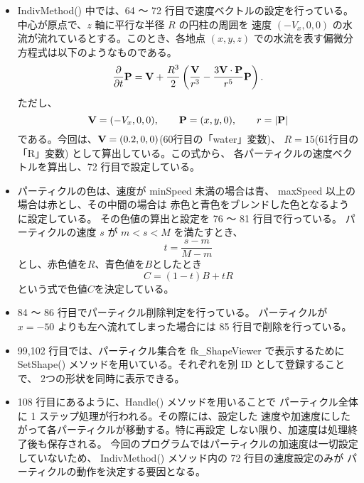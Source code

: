 \begin{itemize}
 \item IndivMethod() 中では、64 〜 72 行目で速度ベクトルの設定を行っている。
	中心が原点で、\(z\) 軸に平行な半径 \(R\) の円柱の周囲を
	速度 \((-V_x, 0, 0)\) の水流が流れているとする。このとき、各地点
	\((x, y, z)\) での水流を表す偏微分方程式は以下のようなものである。
	\begin{equation}
		\frac{\partial}{\partial t}\mathbf{P} =
		\mathbf{V} + \frac{R^3}{2}
		\left(\frac{\mathbf{V}}{r^3} -
		\frac{3 \mathbf{V} \cdot \mathbf{P}}{r^5} \mathbf{P} \right) .
	\end{equation}
	ただし、
	\begin{equation}
		\mathbf{V} = (-V_x, 0, 0), \qquad
		\mathbf{P} = (x, y, 0), \qquad r = |\mathbf{P}|
	\end{equation}
	である。今回は、\(\mathbf{V} = (0.2, 0, 0)\)(60行目の「water」変数)、
	\(R = 15\)(61行目の「R」変数) として算出している。この式から、
	各パーティクルの速度ベクトルを算出し、72 行目で設定している。

 \item パーティクルの色は、速度が minSpeed 未満の場合は青、
	maxSpeed 以上の場合は赤とし、その中間の場合は
	赤色と青色をブレンドした色となるように設定している。
	その色値の算出と設定を 76 〜 81 行目で行っている。
	パーティクルの速度 \(s\) が \(m < s < M\) を満たすとき、
	\begin{equation}
		t = \frac{s - m}{M - m}
	\end{equation}
	とし、赤色値を\(R\)、青色値を\(B\)としたとき
	\begin{equation}
		 C = (1-t)B + tR
	\end{equation}
	という式で色値\(C\)を決定している。

 \item 84 〜 86 行目でパーティクル削除判定を行っている。
	パーティクルが \(x = -50\) よりも左へ流れてしまった場合には
	85 行目で削除を行っている。

 \item 99,102 行目では、パーティクル集合を fk\_ShapeViewer で表示するために
	SetShape() メソッドを用いている。それぞれを別 ID として登録することで、
	2つの形状を同時に表示できる。

 \item 108 行目にあるように、Handle() メソッドを用いることで
	パーティクル全体に 1 ステップ処理が行われる。その際には、設定した
	速度や加速度にしたがって各パーティクルが移動する。特に再設定
	しない限り、加速度は処理終了後も保存される。
	今回のプログラムではパーティクルの加速度は一切設定していないため、
	IndivMethod() メソッド内の 72 行目の速度設定のみが
	パーティクルの動作を決定する要因となる。

\end{itemize}

